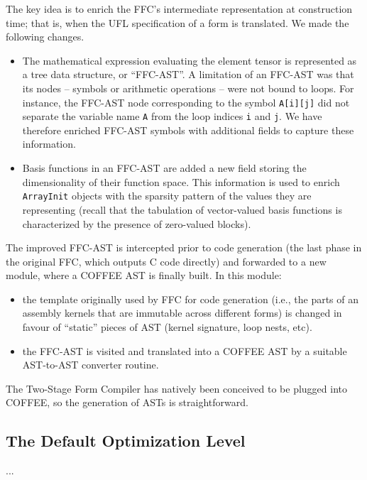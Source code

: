 The key idea is to enrich the FFC's intermediate representation at construction time; that is, when the UFL specification of a form is translated. We made the following changes.
\begin{itemize}
\item The mathematical expression evaluating the element tensor is represented as a tree data structure, or ``FFC-AST''. A limitation of an FFC-AST was that its nodes -- symbols or arithmetic operations -- were not bound to loops. For instance, the FFC-AST node corresponding to the symbol \texttt{A[i][j]} did not separate the variable name \texttt{A} from the loop indices \texttt{i} and \texttt{j}. We have therefore enriched FFC-AST symbols with additional fields to capture these information.
\item Basis functions in an FFC-AST are added a new field storing the dimensionality of their function space. This information is used to enrich \texttt{ArrayInit} objects with the sparsity pattern of the values they are representing (recall that the tabulation of vector-valued basis functions is characterized by the presence of zero-valued blocks).
\end{itemize}

The improved FFC-AST is intercepted prior to code generation (the last phase in the original FFC, which outputs C code directly) and forwarded to a new module, where a COFFEE AST is finally built. In this module:
\begin{itemize}
\item the template originally used by FFC for code generation (i.e., the parts of an assembly kernels that are immutable across different forms) is changed in favour of ``static'' pieces of AST (kernel signature, loop nests, etc).
\item the FFC-AST is visited and translated into a COFFEE AST by a suitable AST-to-AST converter routine.
\end{itemize}

The Two-Stage Form Compiler has natively been conceived to be plugged into COFFEE, so the generation of ASTs is straightforward.

\subsection{The Default Optimization Level}
...

